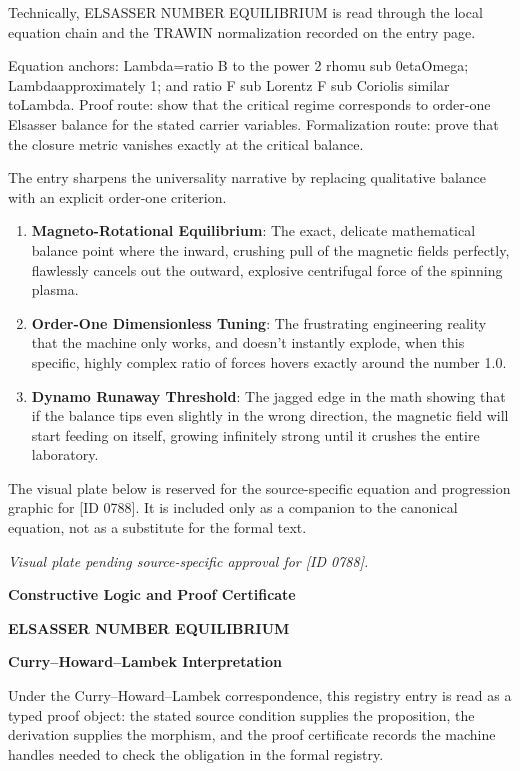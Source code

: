 Technically, ELSASSER NUMBER EQUILIBRIUM is read through the local equation chain and the TRAWIN normalization recorded on the entry page.

Equation anchors: Lambda=ratio B to the power 2 rhomu sub 0etaOmega; Lambdaapproximately 1; and ratio F sub Lorentz F sub Coriolis similar toLambda. Proof route: show that the critical regime corresponds to order-one Elsasser balance for the stated carrier variables. Formalization route: prove that the closure metric vanishes exactly at the critical balance.

The entry sharpens the universality narrative by replacing qualitative balance with an explicit order-one criterion.
\endgroup

\begin{enumerate}[leftmargin=1.6em,itemsep=6pt,topsep=4pt]
\item \textbf{Magneto-Rotational Equilibrium}: The exact, delicate mathematical balance point where the inward, crushing pull of the magnetic fields perfectly, flawlessly cancels out the outward, explosive centrifugal force of the spinning plasma.
\item \textbf{Order-One Dimensionless Tuning}: The frustrating engineering reality that the machine only works, and doesn't instantly explode, when this specific, highly complex ratio of forces hovers exactly around the number 1.0.
\item \textbf{Dynamo Runaway Threshold}: The jagged edge in the math showing that if the balance tips even slightly in the wrong direction, the magnetic field will start feeding on itself, growing infinitely strong until it crushes the entire laboratory.
\end{enumerate}

\begingroup\footnotesize\sloppy
The visual plate below is reserved for the source-specific equation and progression graphic for [ID 0788]. It is included only as a companion to the canonical equation, not as a substitute for the formal text.
\par\endgroup
\begingroup\footnotesize\itshape
Visual plate pending source-specific approval for [ID 0788].
\par\endgroup

\clearpage
\begingroup\tzpsupportsetup
\noindent\textbf{\fontsize{10.8pt}{12.8pt}\selectfont [ID 0788] Constructive Logic and Proof Certificate}\par
\noindent\textbf{\fontsize{10pt}{12pt}\selectfont ELSASSER NUMBER EQUILIBRIUM}\par
\vspace{0.45em}
\begingroup
\footnotesize
\setlength{\parskip}{0.22em}
\setlength{\parindent}{0pt}
\noindent\textbf{Curry--Howard--Lambek Interpretation}\par
Under the Curry--Howard--Lambek correspondence, this registry entry is read as a typed proof
object: the stated source condition supplies the proposition, the derivation supplies the
morphism, and the proof certificate records the machine handles needed to check the obligation
in the formal registry.


